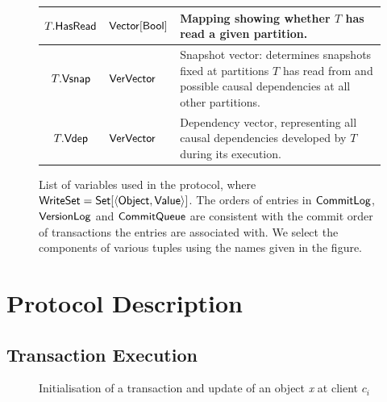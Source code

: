 \begin{figure}[t]
{\begin{tabularx}{\linewidth}{|c|p{5.5cm}|X|}
  \hline
  $T.\mathsf{HasRead}$ & ${\sf Vector}[{\sf Bool}]$ & Mapping showing whether $T$  has
  read a given partition.
\\
  \hline
  $T.\mathsf{Vsnap}$ & ${\sf VerVector}$ & Snapshot vector: determines snapshots fixed at
  partitions $T$ has read from and possible causal dependencies at all other
  partitions.
  \\
  \hline
  $T.\mathsf{Vdep}$ & ${\sf VerVector}$ & Dependency vector, representing all causal
  dependencies developed by $T$ during its execution.
\\
  \hline
\end{tabularx}
}
\caption{List of variables used in the protocol, where
  ${\sf WriteSet} = {\sf Set}[\langle {\sf Object}, {\sf Value} \rangle]$. The orders
  of entries in $\mathsf{CommitLog}$, $\mathsf{VersionLog}$ and $\mathsf{CommitQueue}$ are consistent
  with the commit order of transactions the entries are associated with. We
  select the components of various tuples using the names given in the figure. }
\label{fig:prot-ds-table}
\end{figure}

\section{Protocol Description}



\subsection{Transaction Execution}
\label{prot-tr-ex}

\begin{figure}[h]
\begin{algorithm}[H]
  \setcounter{AlgoLine}{0}

  \smallskip

\end{algorithm}
\caption{Initialisation of a transaction and update of an object \emph{x} at client $c_i$}
\end{figure}

